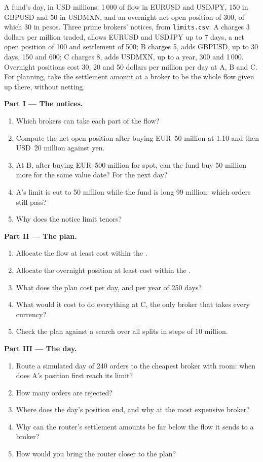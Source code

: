 \begin{problem}\label{pb:m2:getting-access-fx:1}
A fund's day, in USD millions: 1\,000 of flow in EURUSD and USDJPY, 150 in GBPUSD and 50
in USDMXN, and an overnight net open position of 300, of which 30 in pesos. Three prime
brokers' notices, from \texttt{limits.csv}: A charges 3 dollars per million traded,
allows EURUSD and USDJPY up to 7 days, a net open position of 100 and settlement of 500;
B charges 5, adds GBPUSD, up to 30 days, 150 and 600; C charges 8, adds USDMXN, up to a
year, 300 and 1\,000. Overnight positions cost 30, 20 and 50 dollars per million per day
at A, B and C. For planning, take the settlement amount at a broker to be the whole flow
given up there, without netting.

\medskip\noindent\textbf{Part I --- The notices.}
\begin{enumerate}
\item Which brokers can take each part of the flow?
\item Compute the net open position after buying EUR~50 million at 1.10 and then USD~20
million against yen.
\item At B, after buying EUR~500 million for spot, can the fund buy 50 million more for
the same value date? For the next day?
\item A's limit is cut to 50 million while the fund is long 99 million: which orders
still pass?
\item Why does the notice limit tenors?
\end{enumerate}

\medskip\noindent\textbf{Part II --- The plan.}
\begin{enumerate}[resume]
\item Allocate the flow at least cost within the .
\item Allocate the overnight position at least cost within the .
\item What does the plan cost per day, and per year of 250 days?
\item What would it cost to do everything at C, the only broker that takes every
currency?
\item Check the plan against a search over all splits in steps of 10 million.
\end{enumerate}

\medskip\noindent\textbf{Part III --- The day.}
\begin{enumerate}[resume]
\item Route a simulated day of 240 orders to the cheapest broker with room: when does A's
position first reach its limit?
\item How many orders are rejected?
\item Where does the day's position end, and why at the most expensive broker?
\item Why can the router's settlement amounts be far below the flow it sends to a broker?
\item How would you bring the router closer to the plan?
\end{enumerate}


\end{problem}
